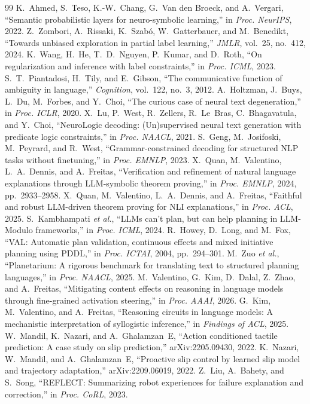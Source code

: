 \documentclass[letterpaper, 10pt, conference]{IEEEtran}
\begin{document}
\begin{thebibliography}{99}
 K.~Ahmed, S.~Teso, K.-W.~Chang, G.~Van den Broeck, and A.~Vergari, ``Semantic probabilistic layers for neuro-symbolic learning,'' in \emph{Proc. NeurIPS}, 2022.
 Z.~Zombori, A.~Rissaki, K.~Szab\'o, W.~Gatterbauer, and M.~Benedikt, ``Towards unbiased exploration in partial label learning,'' \emph{JMLR}, vol.~25, no.~412, 2024.
 K.~Wang, H.~He, T.~D.~Nguyen, P.~Kumar, and D.~Roth, ``On regularization and inference with label constraints,'' in \emph{Proc. ICML}, 2023.
 S.~T.~Piantadosi, H.~Tily, and E.~Gibson, ``The communicative function of ambiguity in language,'' \emph{Cognition}, vol.~122, no.~3, 2012.
 A.~Holtzman, J.~Buys, L.~Du, M.~Forbes, and Y.~Choi, ``The curious case of neural text degeneration,'' in \emph{Proc. ICLR}, 2020.
 X.~Lu, P.~West, R.~Zellers, R.~Le~Bras, C.~Bhagavatula, and Y.~Choi, ``NeuroLogic decoding: (Un)supervised neural text generation with predicate logic constraints,'' in \emph{Proc. NAACL}, 2021.
 S.~Geng, M.~Josifoski, M.~Peyrard, and R.~West, ``Grammar-constrained decoding for structured NLP tasks without finetuning,'' in \emph{Proc. EMNLP}, 2023.
 X.~Quan, M.~Valentino, L.~A.~Dennis, and A.~Freitas, ``Verification and refinement of natural language explanations through LLM-symbolic theorem proving,'' in \emph{Proc. EMNLP}, 2024, pp.~2933--2958.
 X.~Quan, M.~Valentino, L.~A.~Dennis, and A.~Freitas, ``Faithful and robust LLM-driven theorem proving for NLI explanations,'' in \emph{Proc. ACL}, 2025.
 S.~Kambhampati \emph{et al.}, ``LLMs can't plan, but can help planning in LLM-Modulo frameworks,'' in \emph{Proc. ICML}, 2024.
 R.~Howey, D.~Long, and M.~Fox, ``VAL: Automatic plan validation, continuous effects and mixed initiative planning using PDDL,'' in \emph{Proc. ICTAI}, 2004, pp.~294--301.
 M.~Zuo \emph{et al.}, ``Planetarium: A rigorous benchmark for translating text to structured planning languages,'' in \emph{Proc. NAACL}, 2025.
 M.~Valentino, G.~Kim, D.~Dalal, Z.~Zhao, and A.~Freitas, ``Mitigating content effects on reasoning in language models through fine-grained activation steering,'' in \emph{Proc. AAAI}, 2026.
 G.~Kim, M.~Valentino, and A.~Freitas, ``Reasoning circuits in language models: A mechanistic interpretation of syllogistic inference,'' in \emph{Findings of ACL}, 2025.
 W.~Mandil, K.~Nazari, and A.~Ghalamzan~E, ``Action conditioned tactile prediction: A case study on slip prediction,'' arXiv:2205.09430, 2022.
 K.~Nazari, W.~Mandil, and A.~Ghalamzan~E, ``Proactive slip control by learned slip model and trajectory adaptation,'' arXiv:2209.06019, 2022.
 Z.~Liu, A.~Bahety, and S.~Song, ``REFLECT: Summarizing robot experiences for failure explanation and correction,'' in \emph{Proc. CoRL}, 2023.
\end{thebibliography}
\end{document}
